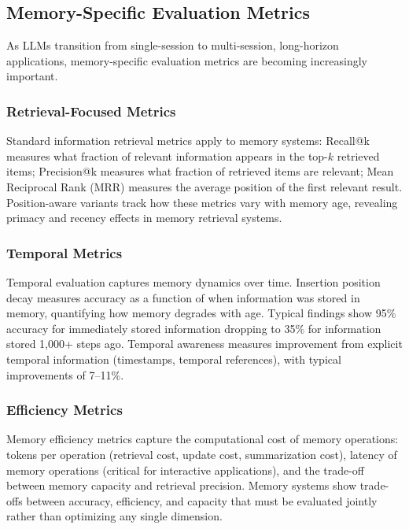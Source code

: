 \documentclass[11pt,letterpaper]{article}
\begin{document}
\subsection{Memory-Specific Evaluation Metrics}

As LLMs transition from single-session to multi-session, long-horizon applications, memory-specific evaluation metrics are becoming increasingly important.

\subsubsection{Retrieval-Focused Metrics}

Standard information retrieval metrics apply to memory systems: Recall@k measures what fraction of relevant information appears in the top-$k$ retrieved items; Precision@k measures what fraction of retrieved items are relevant; Mean Reciprocal Rank (MRR) measures the average position of the first relevant result. Position-aware variants track how these metrics vary with memory age, revealing primacy and recency effects in memory retrieval systems.

\subsubsection{Temporal Metrics}

Temporal evaluation captures memory dynamics over time. Insertion position decay measures accuracy as a function of when information was stored in memory, quantifying how memory degrades with age. Typical findings show 95\% accuracy for immediately stored information dropping to 35\% for information stored 1,000+ steps ago. Temporal awareness measures improvement from explicit temporal information (timestamps, temporal references), with typical improvements of 7--11\%.

\subsubsection{Efficiency Metrics}

Memory efficiency metrics capture the computational cost of memory operations: tokens per operation (retrieval cost, update cost, summarization cost), latency of memory operations (critical for interactive applications), and the trade-off between memory capacity and retrieval precision. Memory systems show trade-offs between accuracy, efficiency, and capacity that must be evaluated jointly rather than optimizing any single dimension.
\end{document}
